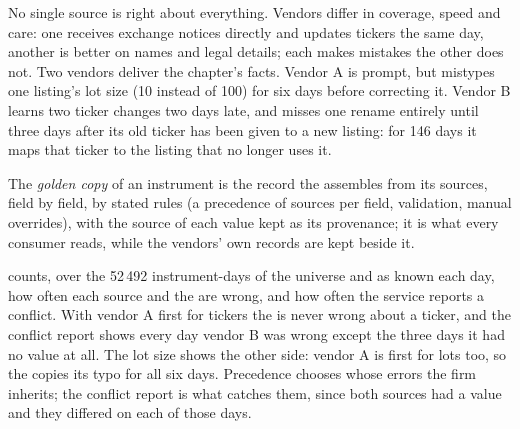 No single source is right about everything. Vendors differ in coverage, speed and care: one receives exchange notices
directly and updates tickers the same day, another is better on names and legal details; each makes mistakes the other does not.
Two vendors deliver the chapter's facts. Vendor A is prompt, but mistypes one listing's lot size (10 instead of 100) for six
days before correcting it. Vendor B learns two ticker changes two days late, and misses one rename entirely until three days
after its old ticker has been given to a new listing: for 146 days it maps that ticker to the listing that no longer uses it.

\begin{definition}\label{def:pl:reference-data-and-symbology-services:golden}
The \emph{golden copy} of an instrument is the record the  assembles from its sources,
field by field, by stated rules (a precedence of sources per field, validation, manual overrides), with the source of each
value kept as its provenance; it is what every consumer reads, while the vendors' own records are kept beside it.
\end{definition}

\label{lst:pl:reference-data-and-symbology-services:golden}

 counts, over the 52\,492 instrument-days of the universe and as known
each day, how often each source and the  are wrong, and how often the service reports a conflict. With vendor A first
for tickers the  is never wrong about a ticker, and the conflict report shows every day vendor B was wrong except the
three days it had no value at all. The lot size shows the other side: vendor A is first for lots too, so the  copies
its typo for all six days. Precedence chooses whose errors the firm inherits; the conflict report is what catches them, since
both sources had a value and they differed on each of those days.

